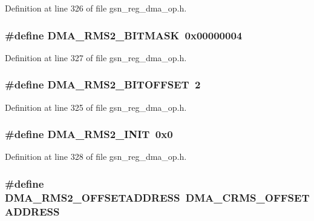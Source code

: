 Definition at line 326 of file gsn\_\-reg\_\-dma\_\-op.h.

\hypertarget{a00547_a6ffdb406a6ebfe102c8162fe72fcc2af}{
\subsubsection[{DMA\_\-RMS2\_\-BITMASK}]{\setlength{\rightskip}{0pt plus 5cm}\#define DMA\_\-RMS2\_\-BITMASK~0x00000004}}
\label{a00547_a6ffdb406a6ebfe102c8162fe72fcc2af}


Definition at line 327 of file gsn\_\-reg\_\-dma\_\-op.h.

\hypertarget{a00547_ac40999a5d03946f8f9ae30b9918013a4}{
\subsubsection[{DMA\_\-RMS2\_\-BITOFFSET}]{\setlength{\rightskip}{0pt plus 5cm}\#define DMA\_\-RMS2\_\-BITOFFSET~2}}
\label{a00547_ac40999a5d03946f8f9ae30b9918013a4}


Definition at line 325 of file gsn\_\-reg\_\-dma\_\-op.h.

\hypertarget{a00547_a550649debe6017fa73f1f4b1d788d85d}{
\subsubsection[{DMA\_\-RMS2\_\-INIT}]{\setlength{\rightskip}{0pt plus 5cm}\#define DMA\_\-RMS2\_\-INIT~0x0}}
\label{a00547_a550649debe6017fa73f1f4b1d788d85d}


Definition at line 328 of file gsn\_\-reg\_\-dma\_\-op.h.

\hypertarget{a00547_a4963a9bfd5c5dd08132f7bfa8da05583}{
\subsubsection[{DMA\_\-RMS2\_\-OFFSETADDRESS}]{\setlength{\rightskip}{0pt plus 5cm}\#define DMA\_\-RMS2\_\-OFFSETADDRESS~DMA\_\-CRMS\_\-OFFSETADDRESS}}
\label{a00547_a4963a9bfd5c5dd08132f7bfa8da05583}


